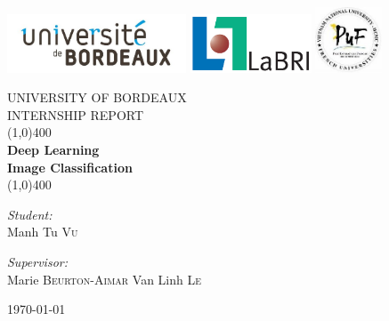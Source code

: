 \documentclass[hidelinks,12pt,a4paper]{report}
\title{}
\author{Tu \textsc{Vu}}
\date{\today}
\begin{document}
\begin{titlepage}
\includegraphics[height=1.75cm, valign=c]{images/bordeaux_logo.jpg}
\hspace*{0.3cm}\includegraphics[height=1.75cm, valign=c]{images/LaBRI_logo.jpg}
\hspace*{1.3cm}\includegraphics[height=1.95cm, valign=c]{images/puf_logo.jpg}\\[1.5cm]
		
	\begin{center}
	
	
	\textsc{\Large UNIVERSITY OF BORDEAUX}\\[1.5cm] %
	
	\textsc{\large INTERNSHIP REPORT}\\[1.5cm] %


	
	\line(1,0){400}\\[0.2in]
	\huge{\bfseries Deep Learning \\ Image Classification}\\
	\line(1,0){400}\\[1.5cm]
	\noindent	
	\begin{minipage}{0.4\textwidth}
		\begin{flushleft} \large
    	\emph{Student:}\\
    	Manh Tu \textsc{Vu}
		\end{flushleft}
	\end{minipage}
	\begin{minipage}{0.4\textwidth}
  		\begin{flushright} \large
    		\emph{Supervisor:} \\
    		Marie \textsc{Beurton-Aimar}
    		Van Linh \textsc{Le}
  		\end{flushright}
	\end{minipage}
	
	\vfill

{\large \today}
	\end{center}
\end{titlepage}
\end{document}
